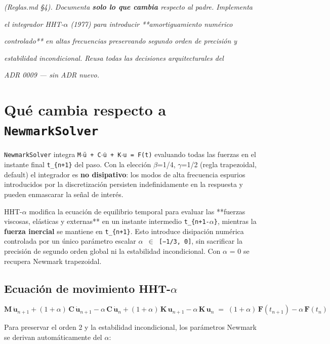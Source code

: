 \documentclass[11pt,letterpaper,oneside]{report}
\begin{document}
\textit{(Reglas.md §4). Documenta \textbf{solo lo que cambia} respecto al padre. Implementa}

\textit{el integrador HHT-\ensuremath{\alpha} (1977) para introducir **amortiguamiento numérico}

\textit{controlado** en altas frecuencias preservando segundo orden de precisión y}

\textit{estabilidad incondicional. Reusa todas las decisiones arquitecturales del}

\textit{ADR 0009 --- sin ADR nuevo.}



\section{Qué cambia respecto a \texttt{NewmarkSolver}}

\texttt{NewmarkSolver} integra \texttt{M\ensuremath{\cdot}ü + C\ensuremath{\cdot}u̇ + K\ensuremath{\cdot}u = F(t)} evaluando todas las fuerzas
en el instante final \texttt{t\_\{n+1\}} del paso. Con la elección \ensuremath{\beta}=1/4, \ensuremath{\gamma}=1/2 (regla
trapezoidal, default) el integrador es \textbf{no disipativo}: los modos de alta
frecuencia espurios introducidos por la discretización persisten
indefinidamente en la respuesta y pueden enmascarar la señal de interés.

HHT-\ensuremath{\alpha} modifica la ecuación de equilibrio temporal para evaluar las **fuerzas
viscosas, elásticas y externas** en un instante intermedio \texttt{t\_\{n+1-\ensuremath{\alpha}\}},
mientras la \textbf{fuerza inercial} se mantiene en \texttt{t\_\{n+1\}}. Esto introduce
disipación numérica controlada por un único parámetro escalar \texttt{\ensuremath{\alpha} \ensuremath{\in} [−1/3, 0]},
sin sacrificar la precisión de segundo orden global ni la estabilidad
incondicional. Con \ensuremath{\alpha} = 0 se recupera Newmark trapezoidal.

\subsection{Ecuación de movimiento HHT-\ensuremath{\alpha}}

\[
\mathbf M\,\ddot{\mathbf u}_{n+1}
  + (1+\alpha)\,\mathbf C\,\dot{\mathbf u}_{n+1} - \alpha\,\mathbf C\,\dot{\mathbf u}_n
  + (1+\alpha)\,\mathbf K\,\mathbf u_{n+1} - \alpha\,\mathbf K\,\mathbf u_n
  \;=\; (1+\alpha)\,\mathbf F(t_{n+1}) - \alpha\,\mathbf F(t_n)
\]

Para preservar el orden 2 y la estabilidad incondicional, los parámetros
Newmark se derivan automáticamente del \ensuremath{\alpha}:
\end{document}

